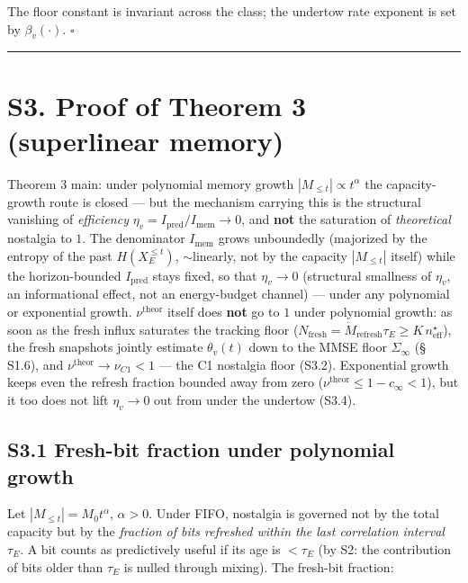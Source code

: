 \documentclass[12pt]{iopart}
\begin{document}
The floor constant is invariant across the class; the undertow rate exponent is set by \(\beta_v(\cdot)\). \(\square\)



\begin{center}\rule{0.5\linewidth}{0.5pt}\end{center}



\section{S3. Proof of Theorem 3 (superlinear memory)}\label{s3.-proof-of-theorem-3-superlinear-memory}



Theorem 3 main: under polynomial memory growth \(|M_{\le t}| \propto t^\alpha\) the capacity-growth route is closed --- but the mechanism carrying this is the structural vanishing of \emph{efficiency} \(\eta_v = I_{\text{pred}}/I_{\text{mem}} \to 0\), and \textbf{not} the saturation of \emph{theoretical} nostalgia to \(1\). The denominator \(I_{\text{mem}}\) grows unboundedly (majorized by the entropy of the past \(H(X_E^{\le t})\), \(\sim\)linearly, not by the capacity \(|M_{\le t}|\) itself) while the horizon-bounded \(I_{\text{pred}}\) stays fixed, so that \(\eta_v \to 0\) (structural smallness of \(\eta_v\), an informational effect, not an energy-budget channel) --- under any polynomial or exponential growth. \(\nu^{\text{theor}}\) itself does \textbf{not} go to \(1\) under polynomial growth: as soon as the fresh influx saturates the tracking floor (\(N_{\text{fresh}} = \dot M_{\text{refresh}}\tau_E \ge K\,n_{\text{eff}}^\star\)), the fresh snapshots jointly estimate \(\theta_v(t)\) down to the MMSE floor \(\Sigma_\infty\) (§ S1.6), and \(\nu^{\text{theor}} \to \nu_{C1} < 1\) --- the C1 nostalgia floor (S3.2). Exponential growth keeps even the refresh fraction bounded away from zero (\(\nu^{\text{theor}} \le 1-c_\infty < 1\)), but it too does not lift \(\eta_v \to 0\) out from under the undertow (S3.4).



\subsection{S3.1 Fresh-bit fraction under polynomial growth}\label{s3.1-fresh-bit-fraction-under-polynomial-growth}



Let \(|M_{\le t}| = M_0 t^\alpha\), \(\alpha > 0\). Under FIFO, nostalgia is governed not by the total capacity but by the \emph{fraction of bits refreshed within the last correlation interval} \(\tau_E\). A bit counts as predictively useful if its age is \(< \tau_E\) (by S2: the contribution of bits older than \(\tau_E\) is nulled through mixing). The fresh-bit fraction:
\end{document}

